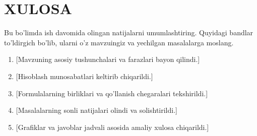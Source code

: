 \clearpage
\section*{XULOSA}

Bu bo’limda ish davomida olingan natijalarni umumlashtiring. Quyidagi bandlar
to’ldirgich bo’lib, ularni o’z mavzuingiz va yechilgan masalalarga moslang.
\begin{enumerate}
  \item {[Mavzuning asosiy tushunchalari va farazlari bayon qilindi.]}
  \item {[Hisoblash munosabatlari keltirib chiqarildi.]}
  \item {[Formulalarning birliklari va qo’llanish chegaralari tekshirildi.]}
  \item {[Masalalarning sonli natijalari olindi va solishtirildi.]}
  \item {[Grafiklar va javoblar jadvali asosida amaliy xulosa chiqarildi.]}
\end{enumerate}
